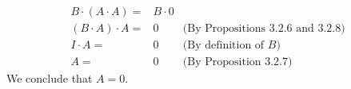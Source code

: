 \documentclass[12pt]{article}
\newenvironment{problem}[2][Problem]
{
	\begin{trivlist} 
		\item[\hskip \labelsep {\bfseries #1 #2:}]
	}
{
	\end{trivlist}
	}
\newenvironment{solution}[1][Solution]
{
	\begin{trivlist} 
		\item[\hskip \labelsep {\itshape #1:}]
	}
	{
	\end{trivlist}
}
\begin{document}
\begin{problem}{5}
\begin{solution}
\begin{align*}
B\cdot (A\cdot A) =& B\cdot 0 &\\
(B\cdot A) \cdot A =& 0 & \text{(By Propositions 3.2.6 and 3.2.8)} \\
I\cdot A =& 0 &\text{(By definition of $B$)}\\
A =& 0 &\text{(By Proposition 3.2.7)}
\end{align*}
We conclude that $A=0$.
\end{solution}
\end{problem}
\end{document}

